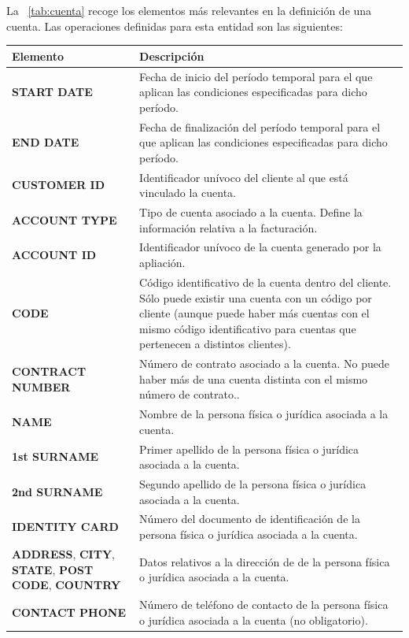 La \tablename~\ref{tab:cuenta} recoge los elementos más relevantes en la definición de una cuenta.
Las operaciones definidas para esta entidad son las siguientes:

\begin{table}
  \centering
  \setlength{\leftmargini}{0.4cm}
  \resizebox{14cm}{!} {
  \begin{tabular}{|m{5cm} m{9cm}|}
  \rowcolor{udcpink!25}
  \hline
  	\textbf{Elemento} & \textbf{Descripción} \\\hline
  	\textbf{START DATE} & Fecha de inicio del período temporal para el que aplican las condiciones especificadas para dicho período.\\
  	\textbf{END DATE} & Fecha de finalización del período temporal para el que aplican las condiciones especificadas para dicho período.\\
	\textbf{CUSTOMER ID} & Identificador unívoco del cliente al que está vinculado la cuenta.\\
	\textbf{ACCOUNT TYPE} & Tipo de cuenta asociado a la cuenta. Define la información relativa a la facturación.\\
	\textbf{ACCOUNT ID} & Identificador unívoco de la cuenta generado por la apliación.\\
	\textbf{CODE} & Código identificativo de la cuenta dentro del cliente. Sólo puede existir una cuenta con un código por cliente (aunque puede haber más cuentas con el mismo código identificativo para cuentas que pertenecen a distintos clientes).\\
	\textbf{CONTRACT NUMBER} & Número de contrato asociado a la cuenta. No puede haber más de una cuenta distinta con el mismo número de contrato..\\
	\textbf{NAME} & Nombre de la persona física o jurídica asociada a la cuenta.\\
	\textbf{1st SURNAME} & Primer apellido de la persona física o jurídica asociada a la cuenta.\\
	\textbf{2nd SURNAME} & Segundo apellido de la persona física o jurídica asociada a la cuenta.\\
	\textbf{IDENTITY CARD} & Número del documento de identificación de la persona física o jurídica asociada a la cuenta.\\	
	\textbf{ADDRESS}, \textbf{CITY}, \textbf{STATE}, \textbf{POST CODE}, \textbf{COUNTRY}  & Datos relativos a la dirección de de la persona física o jurídica asociada a la cuenta.\\	
	\textbf{CONTACT PHONE} & Número de teléfono de contacto de la persona física o jurídica asociada a la cuenta (no obligatorio).\\

\end{tabular}}
\end{table}
